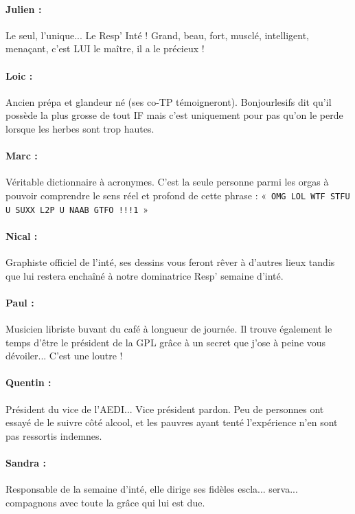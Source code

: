 \clearpage
{}
\paragraph{Julien :}  Le seul, l'unique... Le Resp' Inté ! Grand, beau, fort, musclé, intelligent, menaçant, c'est LUI le maître, il a le précieux !
\paragraph{Loic :} Ancien prépa et glandeur né (ses co-TP témoigneront). Bonjourlesifs dit qu'il possède la plus grosse de tout IF mais c'est uniquement pour pas qu'on le perde lorsque les herbes sont trop hautes.
\paragraph{Marc :} Véritable dictionnaire à acronymes. C'est la seule personne parmi les orgas à pouvoir comprendre le sens réel et profond de cette phrase : «~\texttt{OMG LOL WTF STFU U SUXX L2P U NAAB GTFO !!!1}~»
\paragraph{Nical :} Graphiste officiel de l'inté, ses dessins vous feront rêver à d'autres lieux tandis que lui restera enchaîné à notre dominatrice Resp' semaine d'inté.
\paragraph{Paul :} Musicien libriste buvant du café à longueur de journée. Il trouve également le temps d'être le président de la GPL grâce à un secret que j'ose à peine vous dévoiler... C'est une loutre !
\paragraph{Quentin :} Président du vice de l'AEDI... Vice président pardon. Peu de personnes ont essayé de le suivre côté alcool, et les pauvres ayant tenté l'expérience n'en sont pas ressortis indemnes.
\paragraph{Sandra :} Responsable de la semaine d'inté, elle dirige ses fidèles escla... serva... compagnons avec toute la grâce qui lui est due.
\vspace{0.5cm}
